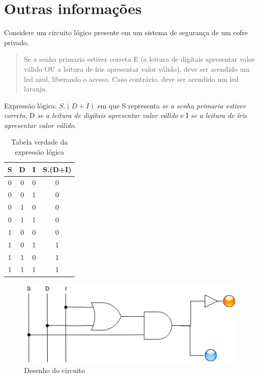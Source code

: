 \chapter{Outras informações}

Considere um circuito lógico presente em um sistema de segurança de um cofre privado.
\begin{quote}
	Se a senha primaria estiver correta E (a leitura de digitais apresentar valor válido OU
	a leitura de íris apresentar valor válido),
	deve ser acendido um led azul, liberando o acesso.
	Caso contrário, deve ser acendido um led laranja.
\end{quote}

Expressão lógica:
$S.(D+I)$
em que S representa \textit{se a senha primaria estiver correta}, D
 \textit{se a leitura de digitais apresentar valor válido} e I \textit{se a leitura de íris apresentar valor válido}.

 \begin{table}[h]
 	\centering
 	\caption{Tabela verdade da expressão lógica}\label{table:tabelaVerdadeOutro}
 	\begin{tabular}{c|c|c|c}
 		\textbf{S} & \textbf{D} & \textbf{I} & \textbf{S.(D+I)} \\
 		\hline
 		0 & 0 & 0 & 0\\\hline
 		0 & 0 & 1 & 0\\\hline
 		0 & 1 & 0 & 0\\\hline
 		0 & 1 & 1 & 0\\\hline
 		1 & 0 & 0 & 0\\\hline
 		1 & 0 & 1 & 1\\\hline
 		1 & 1 & 0 & 1\\\hline
 		1 & 1 & 1 & 1
 	\end{tabular}
 \end{table}

 \begin{figure}[htb]
	 \centering
	 \caption{\label{fig:desenhoOutro}Desenho do circuito}
	 \includegraphics{img/desenhoOutro}
 \end{figure}
